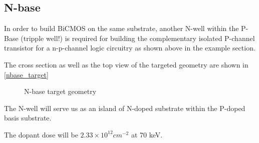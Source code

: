 \subsection{N-base}\label{nbase_chapter}
In order to build BiCMOS on the same substrate, another N-well within the P-Base (tripple well!) is required for building the complementary isolated P-channel transistor for a n-p-channel logic circuitry as shown above in the example section.

The cross section as well as the top view of the targeted geometry are shown in \autoref{nbase_target}

\begin{figure}[H]
	\centering
	\begin{tikzpicture}[node distance = 3cm, auto, thick,scale=\CrossAndTopSectionBig, every node/.style={transform shape}]
		
	\end{tikzpicture}
	\caption{N-base target geometry}
	\label{nbase_target}
\end{figure}

The N-well will serve us as an island of N-doped substrate within the P-doped basis substrate.

The dopant dose will be $2.33\times10^{12}cm^{-2}$ at 70 keV.
